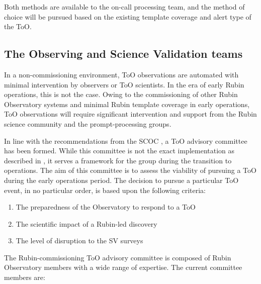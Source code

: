 Both methods are available to the on-call processing team, and the method of choice will be pursued based on the existing template coverage and alert type of the ToO.

\subsection{The Observing and Science Validation teams}\label{subsec:ObsSVTeams}

In a non-commissioning environment, ToO observations are automated with minimal intervention by observers or ToO scientists. In the era of early Rubin operations, this is not the case. Owing to the commissioning of other Rubin Observatory systems and minimal Rubin template coverage in early operations, ToO observations will require significant intervention and support from the Rubin science community and the prompt-processing groups.

In line with the recommendations from the SCOC , a ToO advisory committee has been formed. While this committee is not the exact implementation as described in , it serves a framework for the group during the transition to operations. The aim of this committee is to assess the viability of pursuing a ToO during the early operations period. The decision to pursue a particular ToO event, in no particular order, is based upon the following criteria:

\begin{enumerate}
    \item The preparedness of the Observatory to respond to a ToO
    \item The scientific impact of a Rubin-led discovery
    \item The level of disruption to the SV surveys
\end{enumerate}

The Rubin-commissioning ToO advisory committee is composed of Rubin Observatory members with a wide range of expertise. The current committee members are:

